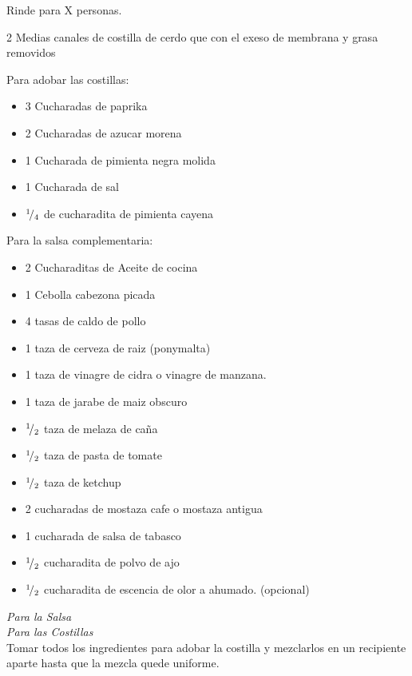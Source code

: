 
Rinde para X personas.


\begin{ingredientes}
\item 2 Medias canales de costilla de cerdo que con el exeso de membrana y grasa removidos
\item Para adobar las costillas:
\begin{itemize}
\item 3 Cucharadas de paprika
\item 2 Cucharadas de azucar morena
\item 1 Cucharada de pimienta negra molida
\item 1 Cucharada de sal
\item ${}^{1}\!/_{4}$ de cucharadita de pimienta cayena
\end{itemize}
\item Para la salsa complementaria:
\begin{itemize}
\item 2 Cucharaditas de Aceite de cocina
\item 1 Cebolla cabezona picada
\item 4 tasas de caldo de pollo
\item 1 taza de cerveza de raiz (ponymalta)
\item 1 taza de vinagre de cidra o vinagre de manzana.
\item 1 taza de jarabe de maiz obscuro
\item ${}^{1}\!/_{2}$ taza de melaza de caña
\item ${}^{1}\!/_{2}$ taza de pasta de tomate
\item ${}^{1}\!/_{2}$ taza de ketchup
\item 2 cucharadas de mostaza cafe o mostaza antigua
\item 1 cucharada de salsa de tabasco
\item ${}^{1}\!/_{2}$ cucharadita de polvo de ajo
\item ${}^{1}\!/_{2}$ cucharadita de escencia de olor a ahumado. (opcional)
\end{itemize}
\end{ingredientes}
\preparacion

\emph{Para la Salsa}\\


\emph{Para las Costillas}\\

Tomar todos los ingredientes para adobar la costilla y mezclarlos en un recipiente aparte hasta que la mezcla quede uniforme.\\

